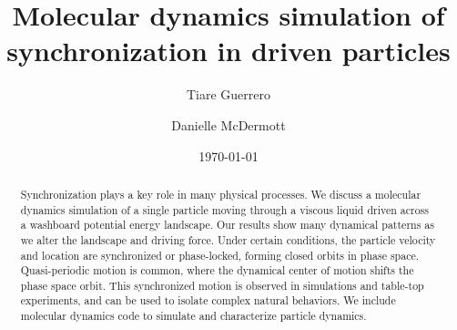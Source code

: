 \documentclass[twocolumn,showpacs,preprintnumbers,amsmath,amssymb,aps,prb]{revtex4}
\begin{document}

\title{Molecular dynamics simulation of synchronization in driven particles}

\author{Tiare Guerrero}

\author{Danielle McDermott}

\date{\today}

\begin{abstract}
  Synchronization
  plays a key role in many physical processes.
  We discuss a 
  molecular dynamics simulation
  of a single particle
  moving through
  a viscous liquid
  driven 
  across a washboard potential energy landscape.
  Our results show many dynamical patterns
  as we alter the landscape and driving force.
  Under certain conditions,
  the particle velocity and location
  are synchronized or 
  phase-locked,
  forming closed orbits in phase space.
  Quasi-periodic motion is common, 
  where the
  dynamical center of motion shifts the
  phase space orbit.
  This synchronized motion
  is
  observed in 
  simulations and table-top experiments,
  and
  can be used to isolate
  complex natural behaviors.
   We include molecular dynamics code
  to simulate and characterize
  particle dynamics.
\end{abstract}

\maketitle %
\end{document}
